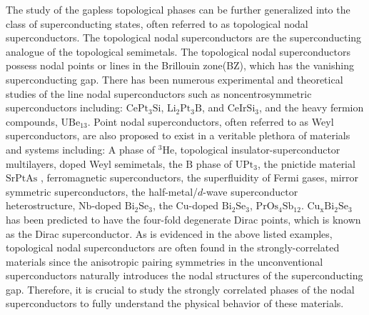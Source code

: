 The study of the gapless topological phases can be further generalized into the class of superconducting states, often referred to as topological nodal superconductors\cite{PhysRevB.90.205136,1367-2630-15-6-065001,PhysRevLett.110.240404,0953-8984-27-24-243201}. The topological nodal superconductors are the superconducting analogue of the topological semimetals. The topological nodal superconductors possess nodal points or lines in the Brillouin zone(BZ), which has the vanishing superconducting gap. There has been numerous experimental and theoretical studies of the line nodal superconductors such as noncentrosymmetric superconductors including: $\mathrm{CePt_3Si}$\cite{PhysRevLett.94.207002,PhysRevLett.94.197002}, $\mathrm{Li_2Pt_3B}$\cite{PhysRevLett.97.017006}, and $\mathrm{CeIrSi_3}$\cite{PhysRevLett.100.107003}, and the heavy fermion compounds, $\mathrm{UBe_{13}}$\cite{PhysRevLett.52.1915}. Point nodal superconductors, often referred to as Weyl superconductors, are also proposed to exist in a veritable plethora of materials and systems including: $\mathrm{A}$ phase of $\mathrm{^{3}He}$\cite{RevModPhys.47.415,Volovik2011,volovik}, topological insulator-superconductor multilayers\cite{PhysRevB.86.054504}, doped Weyl semimetals\cite{PhysRevLett.120.067003,PhysRevB.86.214514,PhysRevB.92.035153,Huang2017,PhysRevB.93.184511}, the $\mathrm{B}$ phase of $\mathrm{UPt_3}$\cite{PhysRevB.92.214504}, the pnictide material $\mathrm{SrPtAs}$ \cite{PhysRevB.89.020509}, ferromagnetic superconductors\cite{PhysRevB.86.104509}, the superfluidity of Fermi gases\cite{PhysRevLett.115.265304,PhysRevLett.114.045302}, mirror symmetric superconductors\cite{PhysRevB.97.060504}, the half-metal/$d$-wave superconductor heterostructure\cite{PhysRevB.95.064513}, $\mathrm{Nb}$-doped $\mathrm{Bi_2Se_3}$\cite{PhysRevB.94.180510,PhysRevB.95.201109,PhysRevB.95.201110}, the $\mathrm{Cu}$-doped $\mathrm{Bi_2Se_3}$\cite{PhysRevB.96.144512,PhysRevB.94.180504,PhysRevLett.113.046401}, $\mathrm{PrOs_4Sb_{12}}$\cite{PhysRevLett.90.117001,PhysRevB.76.054514,ABUALRUB20081178}. $\mathrm{Cu_xBi_2Se_3}$ has been predicted to have the four-fold degenerate Dirac points, which is known as the Dirac superconductor\cite{PhysRevLett.113.046401}. As is evidenced in the above listed examples, topological nodal superconductors are often found in the strongly-correlated materials since the anisotropic pairing symmetries in the unconventional superconductors naturally introduces the nodal structures of the superconducting gap\cite{0953-8984-27-24-243201}. Therefore, it is crucial to study the strongly correlated phases of the nodal superconductors to fully understand the physical behavior of these materials.

